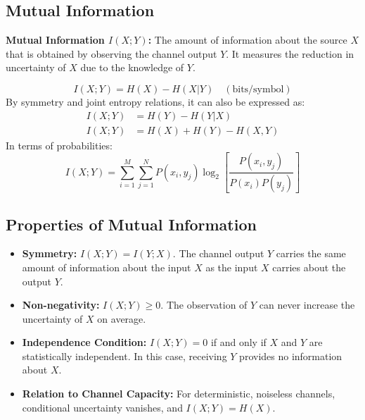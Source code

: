 \documentclass[12pt,a4paper]{article}
\begin{document}
\subsection{Mutual Information}
\begin{tcolorbox}[defbox]
\textbf{Mutual Information $I(X; Y)$:} The amount of information about the source $X$ that is obtained by observing the channel output $Y$. It measures the reduction in uncertainty of $X$ due to the knowledge of $Y$.
\end{tcolorbox}

\begin{tcolorbox}[formulabox, title={\textbf{Mutual Information Formulas}}]
\begin{equation}
  I(X; Y) = H(X) - H(X|Y) \quad (\text{bits/symbol})
\end{equation}
By symmetry and joint entropy relations, it can also be expressed as:
\begin{align}
  I(X; Y) &= H(Y) - H(Y|X) \\
  I(X; Y) &= H(X) + H(Y) - H(X, Y)
\end{align}
In terms of probabilities:
\begin{equation}
  I(X; Y) = \sum_{i=1}^M \sum_{j=1}^N P(x_i, y_j) \log_2 \left[ \frac{P(x_i, y_j)}{P(x_i)P(y_j)} \right]
\end{equation}
\end{tcolorbox}

\subsection{Properties of Mutual Information}
\begin{itemize}[leftmargin=*, itemsep=3pt]
  \item \textbf{Symmetry:} $I(X; Y) = I(Y; X)$. The channel output $Y$ carries the same amount of information about the input $X$ as the input $X$ carries about the output $Y$.
  \item \textbf{Non-negativity:} $I(X; Y) \ge 0$. The observation of $Y$ can never increase the uncertainty of $X$ on average.
  \item \textbf{Independence Condition:} $I(X; Y) = 0$ if and only if $X$ and $Y$ are statistically independent. In this case, receiving $Y$ provides no information about $X$.
  \item \textbf{Relation to Channel Capacity:} For deterministic, noiseless channels, conditional uncertainty vanishes, and $I(X; Y) = H(X)$.
\end{itemize}
\end{document}
